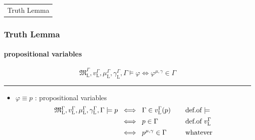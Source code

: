 \documentclass[xcolor=x11names]{beamer}
\makeatletter
\let\beamer@writeslidentry@miniframeson=\beamer@writeslidentry
\def\beamer@writeslidentry@miniframesoff{%
  \expandafter\beamer@ifempty\expandafter{\beamer@framestartpage}{}%
  {%
    \clearpage\beamer@notesactions%
  }
}
\newcommand*{\miniframeson}{\let\beamer@writeslidentry=\beamer@writeslidentry@miniframeson}
\newcommand*{\miniframesoff}{\let\beamer@writeslidentry=\beamer@writeslidentry@miniframesoff}
\newcommand{\cimdia}[1] {\miniframesoff \begin{frame}\begin{center}\huge \begin{tabular}{c}#1\end{tabular}\end{center}\end{frame}\miniframeson}
\newenvironment{tomb}[2][.1]{\arraycolsep=#1cm\begin{array}{#2}}{\end{array}}
\makeatother
\begin{document}
\cimdia{Truth Lemma}

\begin{frame}[t]
\frametitle{Truth Lemma}\framesubtitle{propositional variables}
\scriptsize
\[
\mathfrak M_{\mathrm L}^\Gamma, v_{\mathrm L}^\Gamma, \mu_{\mathrm L}^\Gamma, \gamma_{\mathrm L}^\Gamma, \Gamma \models \varphi
\iff  \varphi^{\mu, \gamma} \in \Gamma\]
\hrule
\bigskip

\begin{itemize}
\item $\varphi \equiv p$ : propositional variables
 \[
  \begin{tomb}{rclll}
            \mathfrak M_{\mathrm L}^\Gamma, v_{\mathrm L}^\Gamma, \mu_{\mathrm L}^\Gamma, \gamma_{\mathrm L}^\Gamma, \Gamma  \models p
    &\iff & \Gamma \in v_{\mathrm L}^\Gamma(p)
     &\quad& \textup{def.of $\models$}
 \\[1ex]&\iff & p\in \Gamma
     &\quad& \textup{def.of $v_{\mathrm L}^\Gamma$}
 \\[1ex]&\iff & p^{\mu, \gamma}\in \Gamma
     &\quad& \textup{whatever}
 \end{tomb}\]
\end{itemize}
\end{frame}
\end{document}
